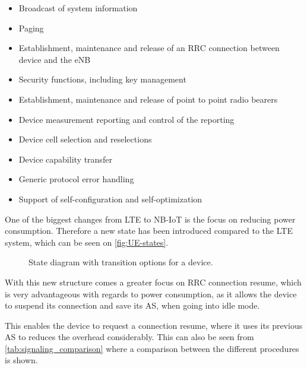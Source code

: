 \begin{itemize}
	\item Broadcast of system information
	\item Paging
	\item Establishment, maintenance and release of an \gls{RRC} connection between device and the \gls{eNB}
	\item Security functions, including key management
	\item Establishment, maintenance and release of point to point radio bearers
	\item Device measurement reporting and control of the reporting
	\item Device cell selection and reselections 
	\item Device capability transfer
	\item Generic protocol error handling
	\item Support of self-configuration and self-optimization
\end{itemize}

One of the biggest changes from \gls{LTE} to \gls{NB-IoT} is the focus on reducing power consumption. Therefore a new state has been introduced compared to the \gls{LTE} system, which can be seen on \autoref{fig:UE-states}.

\begin{figure}[H]
\centering

\caption{State diagram with transition options for a device.}
\label{fig:UE-states}
\end{figure}


With this new structure comes a greater focus on \gls{RRC} connection resume, which is very advantageous with regards to power consumption, as it allows the device to suspend its connection and save its \gls{AS}, when going into idle mode.

This enables the device to request a connection resume, where it uses its previous \gls{AS} to reduces the overhead considerably. This can also be seen from \autoref{tab:signaling_comparison} where a comparison between the different procedures is shown. 

